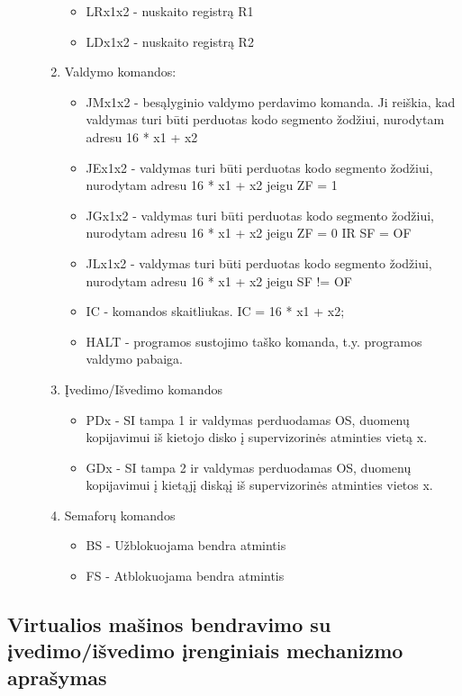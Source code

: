 \begin{description}
\begin{enumerate}
\begin{itemize}
\item LRx1x2 -  nuskaito registrą R1
\item LDx1x2 -  nuskaito registrą R2
\end{itemize}
\item Valdymo komandos:
	\begin{itemize}
		\item JMx1x2 - besąlyginio valdymo perdavimo komanda. Ji reiškia, kad valdymas turi būti perduotas kodo segmento žodžiui, nurodytam adresu 16 * x1 + x2	
		\item JEx1x2 - valdymas turi būti perduotas kodo segmento žodžiui, nurodytam adresu 16 * x1 + x2 jeigu ZF = 1
		\item JGx1x2 - valdymas turi būti perduotas kodo segmento žodžiui, nurodytam adresu 16 * x1 + x2 jeigu ZF = 0 IR SF = OF
		\item JLx1x2 - valdymas turi būti perduotas kodo segmento žodžiui, nurodytam adresu 16 * x1 + x2 jeigu SF != OF
		\item IC - komandos skaitliukas. IC = 16 * x1 + x2;
		\item HALT - programos sustojimo taško komanda, t.y. programos valdymo pabaiga.
	\end{itemize}

\item Įvedimo/Išvedimo komandos
	\begin{itemize}
		\item PDx - SI tampa 1 ir valdymas perduodamas OS, duomenų kopijavimui iš kietojo disko į supervizorinės atminties vietą x.
		\item GDx - SI tampa 2 ir valdymas perduodamas OS, duomenų kopijavimui į kietąjį diskąį iš supervizorinės atminties vietos x. 
	\end{itemize}

\item Semaforų komandos
	\begin{itemize}
		\item BS - Užblokuojama bendra atmintis
		\item FS - Atblokuojama bendra atmintis
	\end{itemize}

\end{enumerate}
\end{description}   
   
\subsection{Virtualios mašinos bendravimo su įvedimo/išvedimo įrenginiais
mechanizmo aprašymas}

